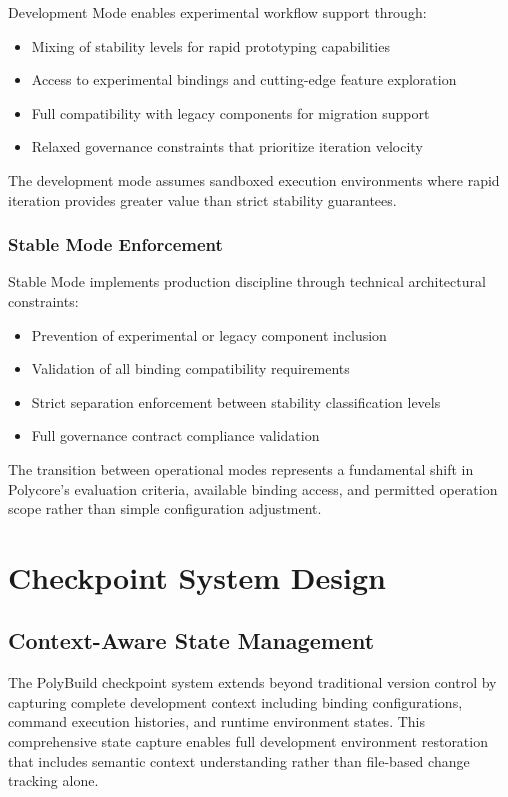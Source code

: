 Development Mode enables experimental workflow support through:
\begin{itemize}
\item Mixing of stability levels for rapid prototyping capabilities
\item Access to experimental bindings and cutting-edge feature exploration
\item Full compatibility with legacy components for migration support
\item Relaxed governance constraints that prioritize iteration velocity
\end{itemize}

The development mode assumes sandboxed execution environments where rapid iteration provides greater value than strict stability guarantees.

\subsubsection{Stable Mode Enforcement}

Stable Mode implements production discipline through technical architectural constraints:
\begin{itemize}
\item Prevention of experimental or legacy component inclusion
\item Validation of all binding compatibility requirements
\item Strict separation enforcement between stability classification levels
\item Full governance contract compliance validation
\end{itemize}

The transition between operational modes represents a fundamental shift in Polycore's evaluation criteria, available binding access, and permitted operation scope rather than simple configuration adjustment.

\section{Checkpoint System Design}

\subsection{Context-Aware State Management}

The PolyBuild checkpoint system extends beyond traditional version control by capturing complete development context including binding configurations, command execution histories, and runtime environment states. This comprehensive state capture enables full development environment restoration that includes semantic context understanding rather than file-based change tracking alone.

